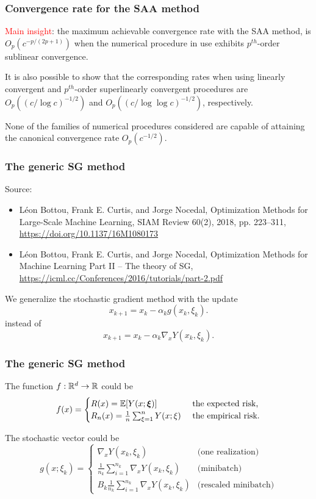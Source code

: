 \documentclass[usepdftitle=false, aspectratio=169]{beamer}
\begin{document}
\begin{frame}
\frametitle{Convergence rate for the SAA method}

\textcolor{red}{Main insight}: the maximum achievable convergence rate with the SAA method, is $O_p ( c^{- p /( 2p + 1 )})$ when the numerical
procedure in use exhibits $p^{th}$-order sublinear convergence.

\mbox{}

It is also possible to show that the corresponding rates when using linearly convergent and $p^{th}$-order superlinearly convergent procedures are $O_p (( c / \log c )^{-1/2} )$ and $O_p (( c / \log\log c )^{-1/2} )$, respectively.

\mbox{}

None of the families of numerical procedures considered are capable
of attaining the canonical convergence rate $O_p ( c^{-1/2} )$.

\end{frame}

\begin{frame}
\frametitle{The generic SG method}

Source:
\begin{itemize}
\item 
Léon Bottou, Frank E. Curtis, and Jorge Nocedal, Optimization Methods for Large-Scale Machine Learning, SIAM Review 60(2), 2018, pp. 223--311, \url{https://doi.org/10.1137/16M1080173}
\item
Léon Bottou, Frank E. Curtis, and Jorge Nocedal, Optimization Methods for Machine Learning
Part II – The theory of SG, \url{https://icml.cc/Conferences/2016/tutorials/part-2.pdf}
\end{itemize}

\mbox{}

We generalize the stochastic gradient method with the update
$$
x_{k+1} = x_k - \alpha_k g(x_k, \xi_k).
$$
instead of
$$
x_{k+1} = x_k - \alpha_k \nabla_x Y(x_k, \xi_k).
$$

\end{frame}

\begin{frame}
\frametitle{The generic SG method}

The function $f: {\mathbb{R}}^d \rightarrow {\mathbb{R}}$ could be
$$
f(x) =
\begin{cases}
R(x) = {\mathbb{E}} [ Y(x; {\boldsymbol{\xi}}) ] & \text{ the expected risk,} \\
R_n(x) = \frac{1}{n} \sum_{\xi = 1}^n Y(x; \xi) & \text{ the empirical risk.}
\end{cases}
$$

\mbox{}

The stochastic vector could be
$$
g(x; \xi_k) =
\begin{cases}
\nabla_x Y(x_k, \xi_k) & \text{(one realization)} \\
\frac{1}{n_k} \sum_{i = 1}^{n_k} \nabla_x Y(x_k, \xi_k) & \text{(minibatch)} \\
B_k \frac{1}{n_k} \sum_{i = 1}^{n_k} \nabla_x Y(x_k, \xi_k)
& \text{(rescaled minibatch)}
\end{cases}
$$

\end{frame}
\end{document}
